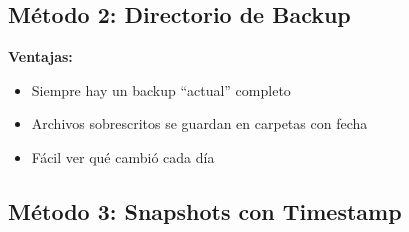 \documentclass[
  doc,
  floatsintext,
  longtable,
  a4paper,
  nolmodern,
  notxfonts,
  notimes,
  12pt,
  colorlinks=true,linkcolor=blue,citecolor=blue,urlcolor=blue]{apa7}
\newenvironment{Shaded}{\begin{snugshade}}{\end{snugshade}}
\newcommand{\AttributeTok}[1]{\textcolor[rgb]{0.40,0.45,0.13}{#1}}
\newcommand{\CommentTok}[1]{\textcolor[rgb]{0.37,0.37,0.37}{#1}}
\newcommand{\DataTypeTok}[1]{\textcolor[rgb]{0.68,0.00,0.00}{#1}}
\newcommand{\FunctionTok}[1]{\textcolor[rgb]{0.28,0.35,0.67}{#1}}
\newcommand{\NormalTok}[1]{\textcolor[rgb]{0.00,0.23,0.31}{#1}}
\newcommand{\OperatorTok}[1]{\textcolor[rgb]{0.37,0.37,0.37}{#1}}
\newcommand{\VariableTok}[1]{\textcolor[rgb]{0.07,0.07,0.07}{#1}}
\providecommand{\tightlist}{%
  \setlength{\itemsep}{0pt}\setlength{\parskip}{0pt}}
\begin{document}
\subsection{Método 2: Directorio de
Backup}\label{muxe9todo-2-directorio-de-backup}

\begin{Shaded}
\end{Shaded}

\textbf{Ventajas:}

\begin{itemize}
\tightlist
\item
  Siempre hay un backup ``actual'' completo
\item
  Archivos sobrescritos se guardan en carpetas con fecha
\item
  Fácil ver qué cambió cada día
\end{itemize}

\subsection{Método 3: Snapshots con
Timestamp}\label{muxe9todo-3-snapshots-con-timestamp}
\end{document}
